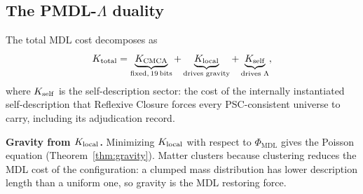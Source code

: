 \documentclass[11pt]{article}
\theoremstyle{remark}
\newcommand{\PHIMDL}{\Phi_{\mathrm{MDL}}}
\begin{document}
\subsection{The PMDL-$\Lambda$ duality}
\label{ssec:pmdl_lambda}

The total MDL cost decomposes as
\[
  K_{\rm total} = \underbrace{K_{\rm CMCA}}_{\text{fixed},\,19\,\text{bits}} +
  \underbrace{K_{\rm local}}_{\text{drives gravity}} +
  \underbrace{K_{\rm self}}_{\text{drives }\Lambda},
\]
where $K_{\rm self}$ is the self-description sector: the cost of the internally
instantiated self-description that Reflexive Closure forces every PSC-consistent
universe to carry, including its adjudication record.

\noindent\textbf{Gravity from $K_{\rm local}$.}
Minimizing $K_{\rm local}$ with respect to $\PHIMDL$ gives the Poisson equation
(Theorem~\ref{thm:gravity}). Matter clusters because clustering reduces the MDL
cost of the configuration: a clumped mass distribution has lower description length
than a uniform one, so gravity is the MDL restoring force.
\end{document}
